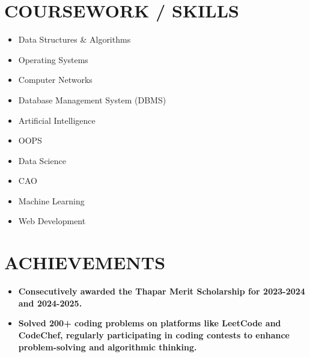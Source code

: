 \documentclass[letterpaper,11pt]{article}
\newcommand{\resumeItem}[1]{
  \item\small{
    {#1 \vspace{-2pt}}
  }
}
\newcommand{\resumeSubHeadingListStart}{\begin{itemize}[leftmargin=0.0in, label={}]}
\newcommand{\resumeSubHeadingListEnd}{\end{itemize}}
\newcommand{\resumeItemListStart}{\begin{itemize}}
\newcommand{\resumeItemListEnd}{\end{itemize}\vspace{-5pt}}
\begin{document}
\section{COURSEWORK / SKILLS}
\begin{multicols}{4}
  \begin{itemize}[itemsep=-2pt, parsep=5pt]
    \item Data Structures \& Algorithms
    \item Operating Systems
    \item Computer Networks
    \item Database Management System (DBMS)
    \item Artificial Intelligence
    \item OOPS 
    \item Data Science
    \item CAO
    \item Machine Learning
    \item Web Development
  \end{itemize}
\end{multicols}
\vspace{-10pt}


\section{ACHIEVEMENTS}
\resumeItemListStart
    \resumeItem{\normalsize{\textbf{Consecutively awarded the Thapar Merit Scholarship for 2023-2024 and 2024-2025.}}}
    \resumeItem{\normalsize{\textbf{Solved 200+ coding problems on platforms like LeetCode and CodeChef, regularly participating in coding contests to enhance problem-solving and algorithmic thinking.}}}
\resumeItemListEnd
\vspace{-10pt}
\end{document}
